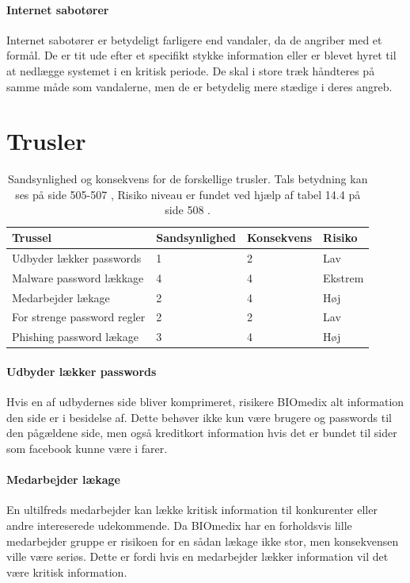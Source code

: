 \documentclass{article}
\begin{document}
\paragraph{Internet sabotører}
Internet sabotører er betydeligt farligere end vandaler, da de angriber med
et formål. De er tit ude efter et specifikt stykke information eller er 
blevet hyret til at nedlægge systemet i en kritisk periode. De skal i store
træk håndteres på samme måde som vandalerne, men de er betydelig mere stædige
i deres angreb.

\section{Trusler}

\begin{table}[h!]
    \begin{tabular}{l|l|l|l}
        Trussel                                    & Sandsynlighed & Konsekvens & Risiko\\\hline
        Udbyder lækker passwords                   & 1 & 2 & Lav\\
        Malware password lækkage                   & 4 & 4 & Ekstrem\\
        Medarbejder lækage                        & 2 & 4 & Høj\\
        For strenge password regler                & 2 & 2 & Lav\\
        Phishing password lækage                  & 3 & 4 & Høj
    \end{tabular}
    \label{tab:Trusler}
    \caption{Sandsynlighed og konsekvens for de forskellige trusler. Tals betydning kan ses på side 505-507 \cite{Bog}, Risiko niveau er fundet ved hjælp af tabel 14.4 på side 508 \cite{Bog}.}
\end{table}

\paragraph{Udbyder lækker passwords}
Hvis en af udbydernes side bliver komprimeret, risikere BIOmedix alt information
den side er i besidelse af. Dette behøver ikke kun være brugere og passwords til
den pågældene side, men også kreditkort information hvis det er bundet til
sider som facebook kunne være i farer.

\paragraph{Medarbejder lækage}
En ultilfreds medarbejder kan lække kritisk information til konkurenter
eller andre intereserede udekommende. Da BIOmedix har en forholdsvis lille
medarbejder gruppe er risikoen for en sådan lækage ikke stor, men konsekvensen
ville være seriøs. Dette er fordi hvis en medarbejder lækker information
vil det være kritisk information.
\end{document}
